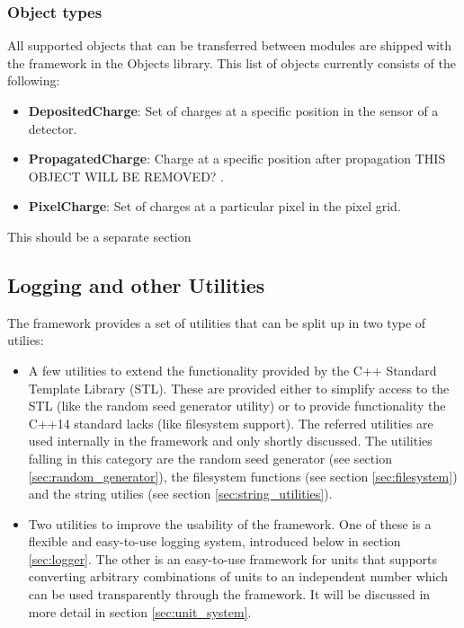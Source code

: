 \subsubsection{Object types}
All supported objects that can be transferred between modules are shipped with the framework in the Objects library. This list of objects currently consists of the following:
\begin{itemize}
\item \textbf{DepositedCharge}: Set of charges at a specific position in the sensor of a detector.
\item \textbf{PropagatedCharge}: Charge at a specific position after propagation \todo THIS OBJECT WILL BE REMOVED? \todo.
\item \textbf{PixelCharge}: Set of charges at a particular pixel in the pixel grid.
\end{itemize}

\todo This should be a separate section \todo

\subsection{Logging and other Utilities}
\label{sec:logging_utilities}
The \apsq framework provides a set of utilities that can be split up in two type of utilies:
\begin{itemize}
\item A few utilities to extend the functionality provided by the C++ Standard Template Library (STL). These are provided either to simplify access to the STL (like the random seed generator utility) or to provide functionality the C++14 standard lacks (like filesystem support). The referred utilities are used internally in the framework and only shortly discussed. The utilities falling in this category are the random seed generator (see section \ref{sec:random_generator}), the filesystem functions (see section \ref{sec:filesystem}) and the string utilies (see section \ref{sec:string_utilities}).
\item Two utilities to improve the usability of the framework. One of these is a flexible and easy-to-use logging system, introduced below in section \ref{sec:logger}. The other is an easy-to-use framework for units that supports converting arbitrary combinations of units to an independent number which can  be used transparently through the framework. It will be discussed in more detail in section \ref{sec:unit_system}.
\end{itemize}

